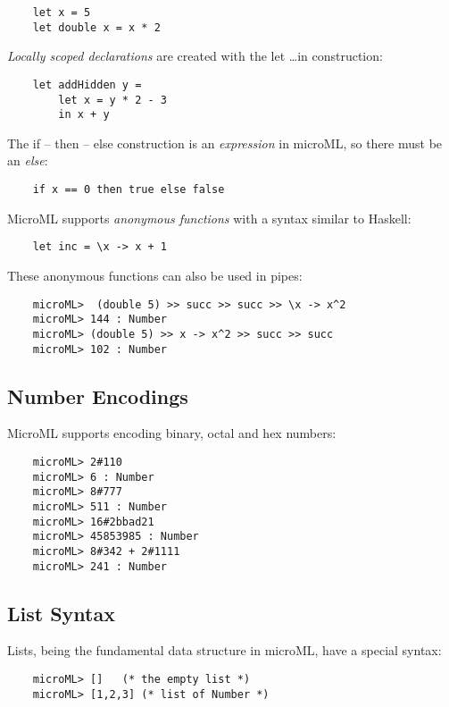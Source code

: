 \begin{verbatim}
    let x = 5
    let double x = x * 2
\end{verbatim}

\textit{Locally scoped declarations} are created with the let \dots in construction:

\begin{verbatim}
    let addHidden y = 
        let x = y * 2 - 3 
        in x + y
\end{verbatim}

The if -- then -- else construction is an \textit{expression} in microML, so there must be an
\textit{else}:

\begin{verbatim}
    if x == 0 then true else false
\end{verbatim}

MicroML supports \textit{anonymous functions} with a syntax similar to Haskell:

\begin{verbatim}
    let inc = \x -> x + 1
\end{verbatim}

These anonymous functions can also be used in pipes:

\begin{verbatim}
    microML>  (double 5) >> succ >> succ >> \x -> x^2
    microML> 144 : Number
    microML> (double 5) >> x -> x^2 >> succ >> succ
    microML> 102 : Number
\end{verbatim}

\subsection{Number Encodings}
MicroML supports encoding binary, octal and hex numbers:

\begin{verbatim}
    microML> 2#110
    microML> 6 : Number
    microML> 8#777
    microML> 511 : Number
    microML> 16#2bbad21
    microML> 45853985 : Number
    microML> 8#342 + 2#1111
    microML> 241 : Number
\end{verbatim}

\subsection{List Syntax}
Lists, being the fundamental data structure in microML, have a special syntax:

\begin{verbatim}
    microML> []   (* the empty list *)
    microML> [1,2,3] (* list of Number *)
\end{verbatim}

